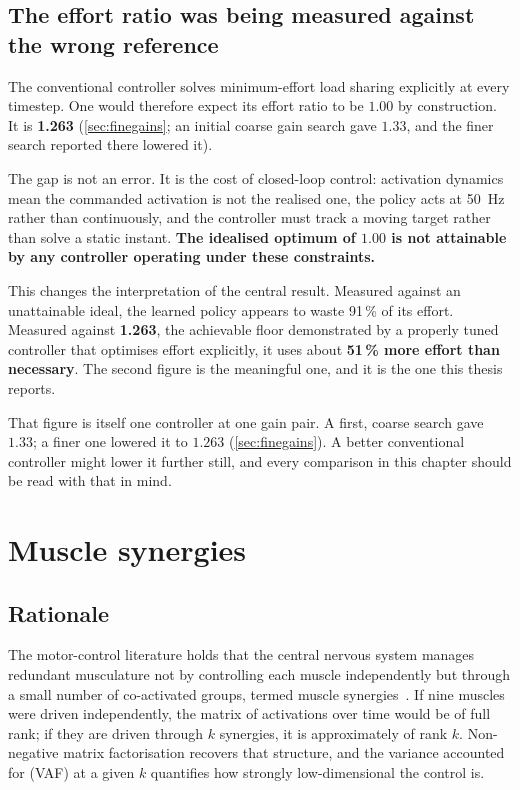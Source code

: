 \subsection{The effort ratio was being measured against the wrong reference}
\label{sec:effortfloor}

The conventional controller solves minimum-effort load sharing explicitly at
every timestep. One would therefore expect its effort ratio to be $1.00$ by
construction. It is \textbf{1.263} (\cref{sec:finegains}; an initial coarse
gain search gave $1.33$, and the finer search reported there lowered it).

The gap is not an error. It is the cost of closed-loop control: activation
dynamics mean the commanded activation is not the realised one, the policy acts
at \SI{50}{\hertz} rather than continuously, and the controller must track a
moving target rather than solve a static instant. \textbf{The idealised optimum
of $1.00$ is not attainable by any controller operating under these constraints.}

This changes the interpretation of the central result. Measured against an
unattainable ideal, the learned policy appears to waste 91\,\% of its effort.
Measured against \textbf{1.263}, the achievable floor demonstrated by a properly
tuned controller that optimises effort explicitly, it uses about \textbf{51\,\%
more effort than necessary}. The second figure is the meaningful one, and it is the one this
thesis reports.

That figure is itself one controller at one gain pair. A first, coarse search
gave $1.33$; a finer one lowered it to $1.263$ (\cref{sec:finegains}). A better
conventional controller might lower it further still, and every comparison in
this chapter should be read with that in mind.

\section{Muscle synergies}
\label{sec:synergies}

\subsection{Rationale}

The motor-control literature holds that the central nervous system manages
redundant musculature not by controlling each muscle independently but through a
small number of co-activated groups, termed muscle
synergies~\parencite{dAvella2003, Ting2007}. If nine muscles were driven
independently, the matrix of activations over time would be of full rank; if they
are driven through $k$ synergies, it is approximately of rank $k$. Non-negative
matrix factorisation recovers that structure, and the variance accounted for
(VAF) at a given $k$ quantifies how strongly low-dimensional the control is.

